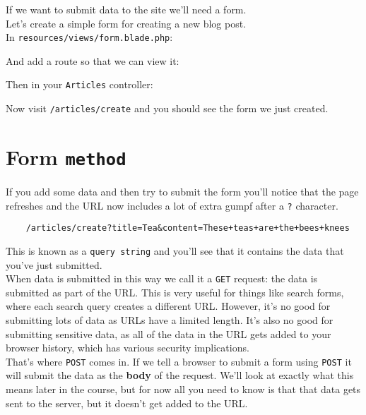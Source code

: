 If we want to submit data to the site we'll need a form.
\\

Let's create a simple form for creating a new blog post.
\\

In \texttt{resources/views/form.blade.php}:


And add a route so that we can view it:


Then in your \texttt{Articles} controller:


Now visit \texttt{/articles/create} and you should see the form we just created.

\section{Form \texttt{method}}

If you add some data and then try to submit the form you'll notice that the page refreshes and the URL now includes a lot of extra gumpf after a \texttt{?} character.

\begin{verbatim}
    /articles/create?title=Tea&content=These+teas+are+the+bees+knees
\end{verbatim}

This is known as a \texttt{query string} and you'll see that it contains the data that you've just submitted.
\\

When data is submitted in this way we call it a \texttt{GET} request: the data is submitted as part of the URL. This is very useful for things like search forms, where each search query creates a different URL. However, it's no good for submitting lots of data as URLs have a limited length. It's also no good for submitting sensitive data, as all of the data in the URL gets added to your browser history, which has various security implications.
\\

That's where \texttt{POST} comes in. If we tell a browser to submit a form using \texttt{POST} it will submit the data as the \textbf{body} of the request. We'll look at exactly what this means later in the course, but for now all you need to know is that that data gets sent to the server, but it doesn't get added to the URL.
\\

